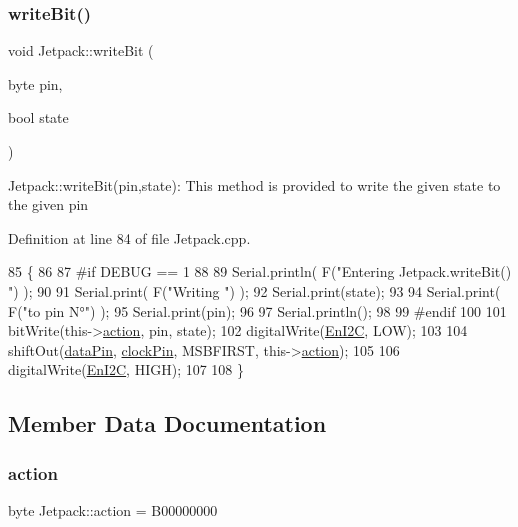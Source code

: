 \subsubsection{\texorpdfstring{write\+Bit()}{writeBit()}}
{\footnotesize\ttfamily void Jetpack\+::write\+Bit (\begin{DoxyParamCaption}\item[{byte}]{pin,  }\item[{bool}]{state }\end{DoxyParamCaption})}

Jetpack\+::write\+Bit(pin,state)\+: This method is provided to write the given state to the given pin 

Definition at line 84 of file Jetpack.\+cpp.


\begin{DoxyCode}
85 \{
86 
87 \textcolor{preprocessor}{#if DEBUG == 1 }
88 
89     Serial.println( F(\textcolor{stringliteral}{"Entering Jetpack.writeBit() "}) );
90 
91     Serial.print( F(\textcolor{stringliteral}{"Writing "}) );
92     Serial.print(state);
93 
94     Serial.print( F(\textcolor{stringliteral}{"to pin N°"}) );
95     Serial.print(pin);
96 
97     Serial.println();
98 
99 \textcolor{preprocessor}{#endif}
100 
101     bitWrite(this->\hyperlink{class_jetpack_aca3142925a7b0834b34ae91d26af7765}{action}, pin, state);
102     digitalWrite(\hyperlink{class_jetpack_a81df984fb4cea98c71aa1a1cfcdfe814}{EnI2C}, LOW);
103     
104     shiftOut(\hyperlink{class_jetpack_a3d669a56e93c71dd25f970d4ed7d0c00}{dataPin}, \hyperlink{class_jetpack_a58ebb991f358f3ae94e82148b0221b5a}{clockPin}, MSBFIRST, this->\hyperlink{class_jetpack_aca3142925a7b0834b34ae91d26af7765}{action});
105 
106     digitalWrite(\hyperlink{class_jetpack_a81df984fb4cea98c71aa1a1cfcdfe814}{EnI2C}, HIGH);
107 
108 \}
\end{DoxyCode}


\subsection{Member Data Documentation}
\mbox{\label{class_jetpack_aca3142925a7b0834b34ae91d26af7765}} 
\subsubsection{\texorpdfstring{action}{action}}
{\footnotesize\ttfamily byte Jetpack\+::action = B00000000\hspace{0.3cm}{\ttfamily [private]}}



